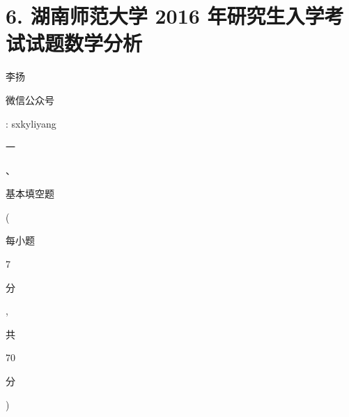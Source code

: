 \documentclass[10pt]{article}
\begin{document}
\section{6. 湖南师范大学 2016 年研究生入学考试试题数学分析}
\begin{CJK}{UTF8}{mj}李扬\end{CJK}

\begin{CJK}{UTF8}{mj}微信公众号\end{CJK}: sxkyliyang

\begin{CJK}{UTF8}{mj}一\end{CJK}、\begin{CJK}{UTF8}{mj}基本填空题\end{CJK}(\begin{CJK}{UTF8}{mj}每小题\end{CJK} 7 \begin{CJK}{UTF8}{mj}分\end{CJK}, \begin{CJK}{UTF8}{mj}共\end{CJK} 70 \begin{CJK}{UTF8}{mj}分\end{CJK})
\end{document}
